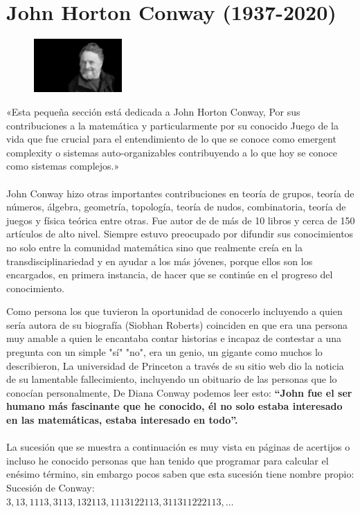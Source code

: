 \chapter{John Horton Conway (1937-2020)}
\begin{figure}
	\includegraphics[width=0.3\textwidth]{capitulo1/images/conway.jpg}
\end{figure}

«Esta pequeña sección está dedicada a John Horton Conway, Por sus contribuciones a la matemática y particularmente por su conocido Juego de la vida que fue crucial para el entendimiento de lo que se conoce como emergent complexity o sistemas auto-organizables contribuyendo a lo que hoy se conoce como sistemas complejos.»
\\\\
John Conway hizo otras importantes contribuciones en teoría de grupos, teoría de números, álgebra, geometría, topología, teoría de nudos, combinatoria, teoría de juegos y física teórica entre otras. Fue autor de de más de 10 libros y cerca de 150 artículos de alto nivel. Siempre estuvo preocupado por difundir sus conocimientos no solo entre la comunidad matemática sino que realmente creía en la transdisciplinariedad y en ayudar a los más jóvenes, porque ellos son los encargados, en primera instancia, de hacer que se continúe en el progreso del conocimiento.

Como persona los que tuvieron la oportunidad de conocerlo incluyendo a quien sería autora de su biografía (Siobhan Roberts) coinciden en que era una persona muy amable a quien le encantaba contar historias e incapaz de contestar a una pregunta con un simple "sí"   "no", era un genio, un gigante como muchos lo describieron, La universidad de Princeton a través de su sitio web dio la noticia de su lamentable fallecimiento, incluyendo un obituario de las personas que lo conocían personalmente,  De Diana Conway podemos leer esto: \textbf{“John fue el ser humano más fascinante que he conocido, él no solo estaba interesado en las matemáticas, estaba interesado en todo”.} \cite{princeton}
\\\\
La sucesión que se muestra a continuación es muy vista en páginas de acertijos o incluso he conocido personas que han tenido que programar para calcular el enésimo término, sin embargo pocos saben que esta sucesión tiene nombre propio: Sucesión de Conway:\\
$3, 13, 1113, 3113, 132113, 1113122113, 311311222113, …$



